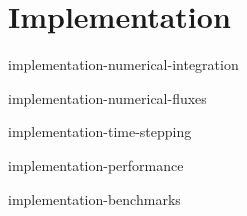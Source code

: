 \chapter{Implementation}
 {implementation-numerical-integration}

 {implementation-numerical-fluxes}

 {implementation-time-stepping}

 {implementation-performance}

 {implementation-benchmarks}